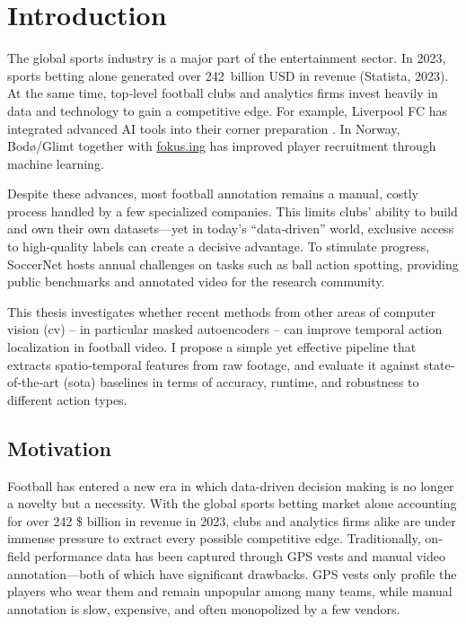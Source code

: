 \chapter{Introduction}
\label{chap:intro}

The global sports industry is a major part of the entertainment sector. In 2023, sports betting alone generated over 242 billion USD in revenue (Statista, 2023). At the same time, top‐level football clubs and analytics firms invest heavily in data and technology to gain a competitive edge. For example, Liverpool FC has integrated advanced AI tools into their corner preparation \cite{wang_tactic_ai_2024}. In Norway, Bodø/Glimt together with \hyperlink{https://fokus.ing}{fokus.ing} has improved player recruitment through machine learning.

Despite these advances, most football annotation remains a manual, costly process handled by a few specialized companies. This limits clubs’ ability to build and own their own datasets—yet in today’s “data‐driven” world, exclusive access to high‐quality labels can create a decisive advantage. To stimulate progress, SoccerNet hosts annual challenges on tasks such as ball action spotting, providing public benchmarks and annotated video for the research community.

This thesis investigates whether recent methods from other areas of computer vision (\acrlong{cv}) – in particular masked autoencoders – can improve temporal action localization in football video. I propose a simple yet effective pipeline that extracts spatio‐temporal features from raw footage, and evaluate it against state‐of‐the‐art (\acrfull{sota}) baselines in terms of accuracy, runtime, and robustness to different action types.

\section{Motivation}
Football has entered a new era in which data-driven decision making is no longer a novelty but a necessity. With the global sports betting market alone accounting for over 242 \$ billion in revenue in 2023, clubs and analytics firms alike are under immense pressure to extract every possible competitive edge. Traditionally, on‐field performance data has been captured through GPS vests and manual video annotation—both of which have significant drawbacks. GPS vests only profile the players who wear them and remain unpopular among many teams, while manual annotation is slow, expensive, and often monopolized by a few vendors.  

